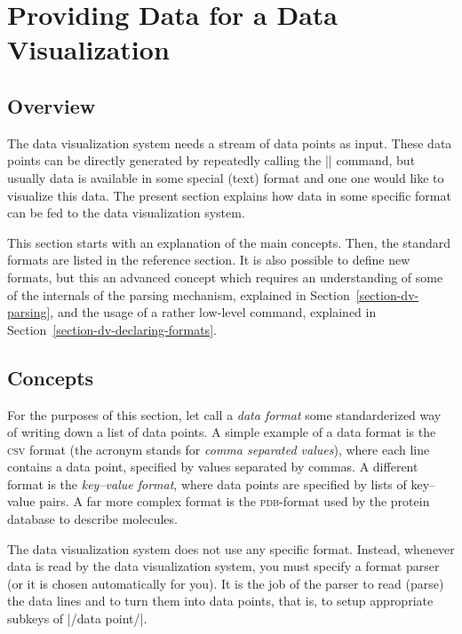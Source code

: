 %
%
%


\section{Providing Data for a Data Visualization}
\label{section-dv-formats}

\subsection{Overview}

The data visualization system needs a stream of data points as
input. These data points can be directly generated by repeatedly
calling the |\pgfdatapoint| command, but usually data is available in
some special (text) format and one one would like to visualize this
data. The present section explains how data in some specific format
can be fed to the data visualization system.

This section starts with an explanation of the main concepts. Then,
the standard formats are listed in the reference section. It is also
possible to define new formats, but this an advanced concept which
requires an understanding of some of the internals of the parsing mechanism,
explained in Section~\ref{section-dv-parsing}, and the usage of a
rather low-level command, explained in Section~\ref{section-dv-declaring-formats}.


\subsection{Concepts}

For the purposes of this section, let call a \emph{data format} some
standarderized way of writing down a list of data points. A simple
example of a data format is the \textsc{csv} format (the acronym
stands for \emph{comma separated values}), where each line contains a
data point, specified by values separated by commas. A different
format is the \emph{key--value format}, where data points are
specified by lists of key--value pairs. A far more complex format is
the \textsc{pdb}-format used by the protein database to describe
molecules.

The data visualization system does not use any specific
format. Instead, whenever data is read by the data visualization
system, you must specify a format parser (or it is chosen
automatically for you). It is the job of the parser to read (parse)
the data lines and to turn them into data points, that is, to setup
appropriate subkeys of |/data point/|.

